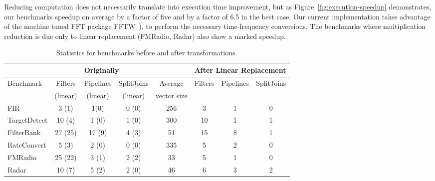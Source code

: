 Reducing computation does not necessarily translate into execution time improvement, but as
Figure~\ref{fig:execution-speedup} demonstrates, our benchmarks speedup on average by a factor of five 
and by a factor of 6.5 in the best case.
Our current implementation takes advantage of the machine tuned 
FFT package FFTW~\cite{frigo99fast}), to perform the necessary time-frequency conversions. 
The benchmarks where multiplication reduction is due only to linear replacement (FMRadio, Radar) 
also show a marked speedup.



\begin{table*}[t]
\centering
\small
\begin{tabular}{|l|c|c|c||c||c|c|c|} 
\hline
          & \multicolumn{3}{|c||}{Originally}  &             & \multicolumn{3}{|c|}{After Linear Replacement} \\
\hline
Benchmark & Filters & Pipelines & SplitJoins & Average     & Filters      & Pipelines         & SplitJoins \\
          & (linear)& (linear)  & (linear)   & vector size &              &                   &            \\
\hline
FIR       & 3 (1)  & 1(0)      & 0 (0)      & 256         & 3            & 1                 & 0 \\
\hline
TargetDetect & 10 (4)& 1 (0)    & 1 (0)      & 300         & 10           & 1                 & 1 \\
\hline
FilterBank & 27 (25) & 17 (9)   & 4 (3)      & 51          & 15           & 8                 & 1 \\
\hline
RateConvert& 5 (3)   & 2 (0)    & 0 (0)      & 335         & 5            & 2                 & 0 \\
\hline
FMRadio    & 25 (22) & 3 (1)    & 2 (2)      & 33          & 5            & 1                 & 0 \\
\hline
Radar      & 10 (7) & 5 (2)     & 2 (0)      & 46          & 6            & 3                 & 2 \\
\hline
\end{tabular}
\caption{Statistics for benchmarks before and after transformations.}
\label{fig:benchmark-statistics}
\end{table*}
